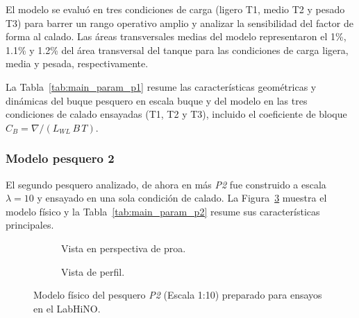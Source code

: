 El modelo se evaluó en tres condiciones de carga (ligero T1, medio T2 y pesado T3) para barrer un rango operativo amplio y analizar la sensibilidad del factor de forma al calado. Las áreas transversales medias del modelo representaron el 1\%, 1.1\% y 1.2\% del área transversal del tanque para las condiciones de carga ligera, media y pesada, respectivamente.

La Tabla~\ref{tab:main_param_p1} resume las características geométricas y
dinámicas del buque pesquero en escala buque y del modelo en las tres condiciones de calado ensayadas (T1, T2 y T3), incluido el coeficiente de bloque $C_B = \nabla/(L_{WL}\,B\,T)$.

\subsubsection{Modelo pesquero 2}
El segundo pesquero analizado, de ahora en más \textit{P2} fue construido a escala $\lambda = 10$ y ensayado en una sola condición de calado. La Figura~\ref{fig:model_contessi} muestra el modelo físico y la Tabla~\ref{tab:main_param_p2} resume sus características principales.

\begin{figure}[htbp]
    \centering
    \begin{subfigure}{\textwidth}
        \centering
        \caption{Vista en perspectiva de proa.}
        \label{fig:contessi_pers}
    \end{subfigure}

    \vspace{0.5em}
    \begin{subfigure}{\textwidth}
        \centering
        \caption{Vista de perfil.}
        \label{fig:contessi_side}
    \end{subfigure}
    \caption{Modelo físico del pesquero \textit{P2} (Escala 1:10) preparado para ensayos en el LabHiNO.}
    \label{fig:model_contessi}
\end{figure}


